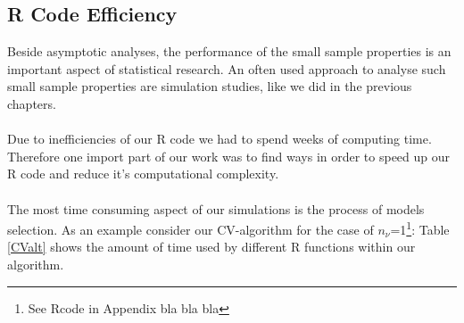 \documentclass[Research_Module_ES.tex]{subfiles}
\begin{document}
\subsection{R Code Efficiency}
Beside asymptotic analyses, the performance of the small sample properties is an important aspect of statistical research. An often used approach to analyse such small sample properties are simulation studies, like we did in the previous chapters.\\
\\
Due to inefficiencies of our R code we had to spend weeks of computing time. Therefore one import part of our work was to find ways in order to speed up our R code and reduce it's computational complexity.\\
\\
The most time consuming aspect of our simulations is the process of models selection. As an example consider our CV-algorithm for the case of $n_\nu$=1\footnote{See Rcode in Appendix bla bla bla}: Table \ref{CValt} shows the amount of time used by different R functions within our algorithm.\\
\end{document}
